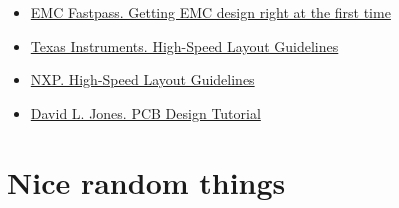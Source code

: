 \documentclass[12pt]{article}
\begin{document}
\begin{itemize}
	\item \href{https://drive.google.com/file/d/1C4cFAzJpTlKedcgKvlWDQnTaCCgdo58s/view?usp=sharing}{EMC Fastpass. Getting EMC design right at the first time}
	\item \href{https://drive.google.com/file/d/1mr8UNMDeXmdCBnOVq22b1YUi3WwKNUMm/view?usp=sharing}{Texas Instruments. High-Speed Layout Guidelines}
	\item \href{https://drive.google.com/file/d/1gwrVG8WULKCOxYYrVLvCCZh1-luvQacq/view?usp=sharing}{NXP. High-Speed Layout Guidelines}
	\item \href{https://drive.google.com/file/d/1ylptbGbczsr2scbjPCba7q4J1PiyvQL8/view?usp=sharing}{David L. Jones. PCB Design Tutorial}
	
\end{itemize}

\section{Nice random things}
\end{document}
